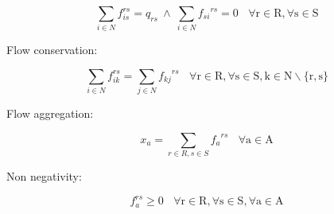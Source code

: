 \documentclass[a4paper, 12pt]{article}
\begin{document}
\begin{large}
\boldmath\begin{equation*}
\sum_{i\in{N}} f_{is}^{rs} = q_{rs}\  \wedge \ \sum_{i\in{N}} {f_{si}}^{rs} = 0 \ \ \ \ \mathrm{\forall{r}\in{R},\forall{s}\in{S}} 
\end{equation*}
\end{large}
Flow conservation: 
\begin{large}
\boldmath\begin{equation*}
\sum_{i\in{N}} f_{ik}^{rs} = \sum_{j\in{N}} {f_{kj}}^{rs} \ \ \ \ \mathrm{\forall{r}\in{R},\forall{s}\in{S},{k}\in{N}{\backslash}{\{}r,s{\}}}
\end{equation*}
\end{large}
Flow aggregation: 
\begin{large}
\boldmath\begin{equation*}
x_{a} = \sum_{r\in{R},s\in{S}} {f_{a}}^{rs} \ \ \ \ \mathrm{\forall{a}\in{A}}
\end{equation*}
\end{large}
Non negativity: 
\begin{large}
\boldmath\begin{equation*}
 f_{a}^{rs} \geq 0 \ \ \ \ \mathrm{\forall{r}\in{R},\forall{s}\in{S},\forall{a}\in{A}} 
\end{equation*}
\end{large}
\end{document}
